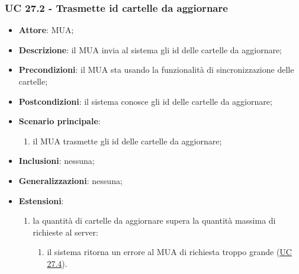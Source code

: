     \subsubsection{UC 27.2 - Trasmette id cartelle da aggiornare} \label{sec:UC27.2}
    \begin{itemize}
        \item \textbf{Attore}: MUA;
        \item \textbf{Descrizione}: il MUA invia al sistema gli id delle cartelle da aggiornare;
        \item \textbf{Precondizioni}: il MUA sta usando la funzionalità di sincronizzazione delle cartelle;
        \item \textbf{Postcondizioni}: il sistema conosce gli id delle cartelle da aggiornare;
        \item \textbf{Scenario principale}:
            \begin{enumerate}
                \item il MUA trasmette gli id delle cartelle da aggiornare;
            \end{enumerate}
        \item \textbf{Inclusioni}: nessuna;
        \item \textbf{Generalizzazioni}: nessuna;
        \item \textbf{Estensioni}:
            \begin{enumerate}[label=\alph*.]
                \item la quantità di cartelle da aggiornare supera la quantità massima di richieste al server:
                \begin{enumerate}[label=\arabic*.]
                    \item il sistema ritorna un errore al MUA di richiesta troppo grande (\hyperref[sec:UC27.4]{UC 27.4}).
                \end{enumerate}
            \end{enumerate}
    \end{itemize}


